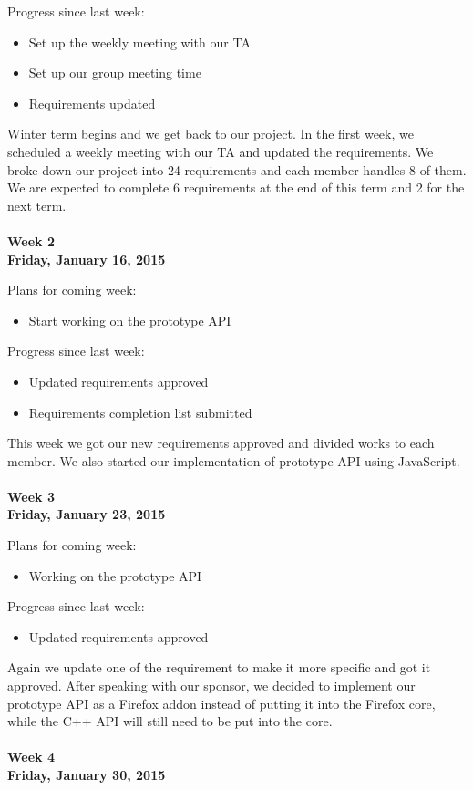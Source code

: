 \noindent Progress since last week:
\begin{itemize}
\item Set up the weekly meeting with our TA
\item Set up our group meeting time
\item Requirements updated
\end{itemize}

\noindent Winter term begins and we get back to our project. In the first week, we scheduled a weekly meeting with our TA and updated the requirements. We broke down our project into 24 requirements and each member handles 8 of them. We are expected to complete 6 requirements at the end of this term and 2 for the next term. \\
\\
\textbf{Week 2\\Friday, January 16, 2015\\}

\noindent Plans for coming week:
\begin{itemize}
\item Start working on the prototype API
\end{itemize}

\noindent Progress since last week:
\begin{itemize}
\item Updated requirements approved
\item Requirements completion list submitted
\end{itemize}

\noindent This week we got our new requirements approved and divided works to each member. We also started our implementation of prototype API using JavaScript. \\
\\
\textbf{Week 3\\Friday, January 23, 2015\\}

\noindent Plans for coming week:
\begin{itemize}
\item Working on the prototype API
\end{itemize}

\noindent Progress since last week:
\begin{itemize}
\item Updated requirements approved
\end{itemize}

\noindent Again we update one of the requirement to make it more specific and got it approved. After speaking with our sponsor, we decided to implement our prototype API as a Firefox addon instead of putting it into the Firefox core, while the C++ API will still need to be put into the core. \\
\\
\textbf{Week 4\\Friday, January 30, 2015\\}

